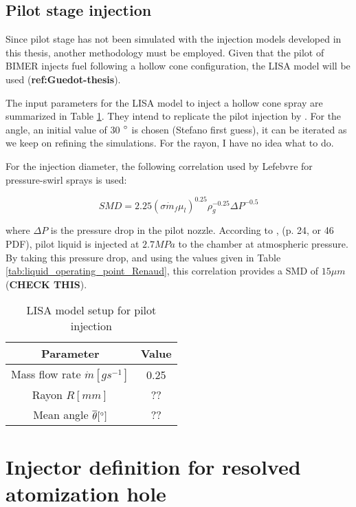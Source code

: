 \subsection{Pilot stage injection}

Since pilot stage has not been simulated with the injection models developed in this thesis, another methodology must be employed. Given that the pilot of BIMER injects fuel following a hollow cone configuration, the LISA model will be used (\textbf{ref:Guedot-thesis}). 

The input parameters for the LISA model to inject a hollow cone spray are summarized in Table \ref{tab:LISA_model_parameters}. They intend to replicate the pilot injection by . For the angle, an initial value of 30 $\degree$ is chosen (Stefano first guess), it can be iterated as we keep on refining the simulations. For the rayon, I have no idea what to do.

For the injection diameter, the following correlation used by Lefebvre for pressure-swirl sprays is used:

\begin{equation}
SMD = 2.25 \left( \sigma \dot{m}_f \mu_l \right)^{0.25} \rho_g^{-0.25}  \Delta P^{-0.5}
\end{equation}

where $\Delta P$ is the pressure drop in the pilot nozzle. According to , (p. 24, or 46 PDF), pilot liquid is injected at $2.7 MPa$ to the chamber at atmospheric pressure. By taking this pressure drop, and using the values given in Table \ref{tab:liquid_operating_point_Renaud}, this correlation provides a SMD of $15 \mu m$ (\textbf{CHECK THIS}).
\begin{table}[!h]
\centering
\caption{LISA model setup for pilot injection}
\begin{tabular}{|c|c|}
\hline
Parameter & Value \\
\hline
Mass flow rate $\dot{m} [g s^{-1}]$ & 0.25 \\
\hline
Rayon $R [mm]$ & ?? \\
\hline
Mean angle $\overline{\theta} [\degree]$ & ?? \\
\hline
\end{tabular}
\label{tab:LISA_model_parameters}
\end{table}

\section{Injector definition for resolved atomization hole}


